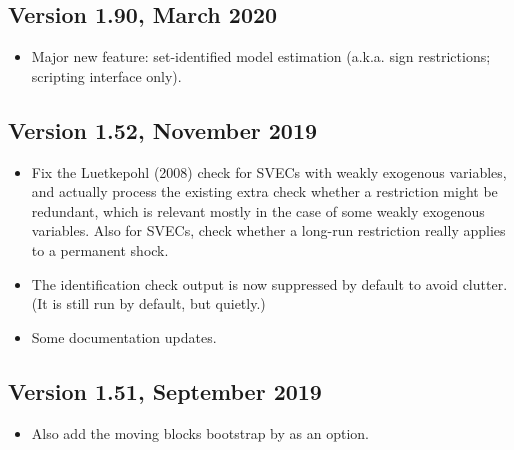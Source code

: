 \documentclass[a4paper,10pt]{article}
\newcounter{script}[section]
\begin{document}
\subsection*{Version 1.90, March 2020}
\begin{itemize}
\item Major new feature: set-identified model estimation (a.k.a. sign restrictions; scripting
interface only). 
 
\end{itemize}

\subsection*{Version 1.52, November 2019}
\begin{itemize}
\item Fix the Luetkepohl (2008) check for SVECs with weakly exogenous variables,
and actually process the existing extra check whether a restriction might be redundant,
which is relevant mostly in the case of some weakly exogenous variables.
Also for SVECs, check whether a long-run restriction really applies to a permanent shock.

\item The identification check output is now suppressed by default to avoid clutter.
(It is still run by default, but quietly.)

\item Some documentation updates.

\end{itemize}


\subsection*{Version 1.51, September 2019}
\begin{itemize}
\item Also add the moving blocks bootstrap by \cite{BrugJenTrenk16} as an option.
\end{itemize}
\end{document}

